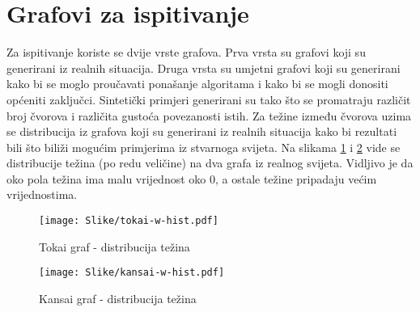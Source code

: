 \documentclass[times, utf8, diplomski, numeric]{fer}
\begin{document}
\section{Grafovi za ispitivanje}

Za ispitivanje koriste se dvije vrste grafova. Prva vrsta su grafovi koji su generirani iz realnih situacija. Druga vrsta su umjetni grafovi koji su generirani kako bi se moglo proučavati ponašanje algoritama i kako bi se mogli donositi općeniti zaključci. Sintetički primjeri generirani su tako što se promatraju različit broj čvorova i različita gustoća povezanosti istih. Za težine između čvorova uzima se distribucija iz grafova koji su generirani iz realnih situacija kako bi rezultati bili što biliži mogućim primjerima iz stvarnoga svijeta. Na slikama \ref{fig:tokai-hist} i \ref{fig:kansai-hist} vide se distribucije težina (po redu veličine) na dva grafa iz realnog svijeta. Vidljivo je da oko pola težina ima malu vrijednost oko $0$, a ostale težine pripadaju većim vrijednostima.

\begin{figure}[H]
	\texttt{[image: Slike/tokai-w-hist.pdf]}
	\caption{Tokai graf - distribucija težina}
	\label{fig:tokai-hist}
\end{figure}


\begin{figure}[H]
	\texttt{[image: Slike/kansai-w-hist.pdf]}
	\caption{Kansai graf - distribucija težina}
	\label{fig:kansai-hist}
\end{figure}
\end{document}
